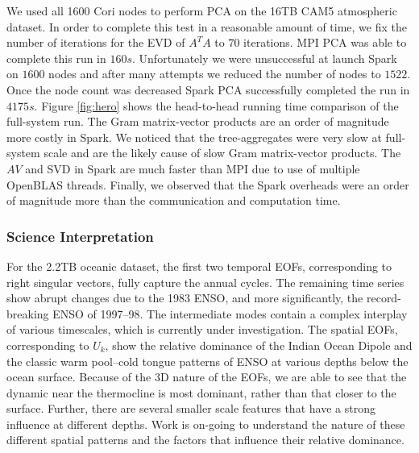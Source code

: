 We used all 1600 Cori nodes to perform PCA on the 16TB CAM5 atmospheric dataset. In order to complete this test in a reasonable amount of time, we fix  the number of iterations for the EVD of $A^TA$ to $70$ iterations. MPI PCA was able to complete this run in $160s$. Unfortunately we were unsuccessful at launch Spark on $1600$ nodes and after many attempts we reduced the number of nodes to $1522$. Once the node count was decreased Spark PCA successfully completed the run in $4175s$. Figure \ref{fig:hero} shows the head-to-head running time comparison of the full-system run. The Gram matrix-vector products are an order of magnitude more costly in Spark. We noticed that the tree-aggregates were very slow at full-system scale and are the likely cause of slow Gram matrix-vector products. The $AV$ and SVD in Spark are much faster than MPI due to use of multiple OpenBLAS threads. Finally, we observed that the Spark overheads were an order of magnitude more than the communication and computation time.

\subsubsection{Science Interpretation}
For the 2.2TB oceanic dataset, the first two temporal EOFs, {corresponding to right singular vectors}, fully capture the annual cycles. The remaining time series show abrupt changes due to the 1983 ENSO, and more significantly, the record-breaking ENSO of 1997--98. The intermediate modes contain a complex interplay of various timescales, which is currently under investigation. The spatial EOFs, corresponding to $U_k$, show the relative dominance of the Indian Ocean Dipole and the classic warm pool--cold tongue patterns of ENSO at various depths below the ocean surface. Because of the 3D nature of the EOFs, we are able to see that the dynamic near the thermocline is most dominant, rather than that closer to the surface. Further, there are several smaller scale features that have a strong influence at different depths. Work is on-going to understand the nature of these different spatial patterns and the factors that influence their relative dominance.

